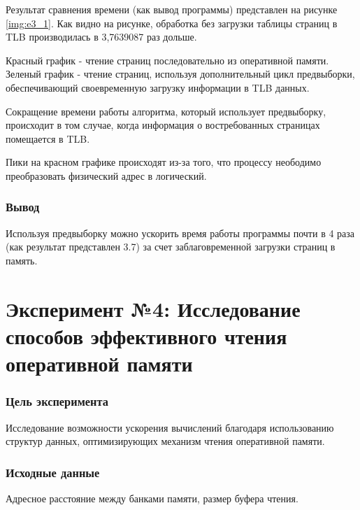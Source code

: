 
Результат сравнения времени (как вывод программы) представлен на рисунке \ref{img:e3_1}. Как видно на рисунке, обработка без загрузки таблицы страниц в TLB производилась в 3,7639087 раз дольше.


Красный график - чтение страниц последовательно из оперативной памяти. Зеленый график - чтение страниц, используя дополнительный цикл предвыборки, обеспечивающий своевременную загрузку информации в TLB данных.

Сокращение времени работы алгоритма, который использует предвыборку, происходит в том случае, когда информация о востребованных страницах помещается в TLB. 

Пики на красном графике происходят из-за того, что процессу неободимо преобразовать физический адрес в логический.

\subsection*{Вывод}
Используя предвыборку можно ускорить время работы программы почти в 4 раза (как результат представлен 3.7) за счет заблаговременной загрузки страниц в память.



\chapter*{Эксперимент №4: Исследование способов эффективного чтения оперативной памяти}

\subsection*{Цель эксперимента}
Исследование возможности ускорения вычислений благодаря использованию структур данных, оптимизирующих механизм чтения оперативной памяти.

\subsection*{Исходные данные}
Адресное расстояние между банками памяти, размер буфера чтения.


